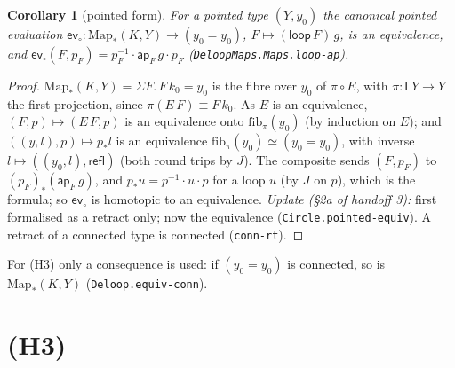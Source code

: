 \documentclass[11pt]{amsart}
\newtheorem{corollary}[theorem]{Corollary}
\theoremstyle{definition}
\theoremstyle{remark}
\newcommand{\Map}{\mathrm{Map}_*}
\newcommand{\fib}{\mathrm{fib}}
\newcommand{\code}[1]{\texttt{#1}}
\newcommand{\Lp}{\mathsf{L}}
\newcommand{\cc}{\cdot}
\newcommand{\refl}{\mathsf{refl}}
\newcommand{\ev}{\mathsf{ev}}
\begin{document}
\begin{corollary}[pointed form]\label{cor:pointed}
For a pointed type $(Y,y_0)$ the canonical pointed evaluation
$\ev_\circ:\Map(K,Y)\to(y_0=y_0)$, $F\mapsto(\mathsf{loop}\,F)\,g$, is an
equivalence, and $\ev_\circ(F,p_F)=p_F^{-1}\cc\mathsf{ap}_F\,g\cc p_F$
(\code{DeloopMaps.Maps.loop-ap}).
\end{corollary}
\begin{proof}
$\Map(K,Y)=\Sigma F.\,F\,k_0=y_0$ is the fibre over $y_0$ of
$\pi\circ E$, with $\pi:\Lp Y\to Y$ the first projection, since
$\pi(E\,F)\equiv F\,k_0$. As $E$ is an equivalence, $(F,p)\mapsto(E\,F,p)$
is an equivalence onto $\fib_\pi(y_0)$ (by induction on $E$); and
$((y,l),p)\mapsto p_*l$ is an equivalence $\fib_\pi(y_0)\simeq(y_0=y_0)$,
with inverse $l\mapsto((y_0,l),\refl)$ (both round trips by $J$). The
composite sends $(F,p_F)$ to $(p_F)_*(\mathsf{ap}_F\,g)$, and
$p_*u=p^{-1}\cc u\cc p$ for a loop $u$ (by $J$ on $p$), which is the
formula; so $\ev_\circ$ is homotopic to an equivalence. \emph{Update
(\S2a of handoff 3):} first formalised as a retract only; now the
equivalence (\code{Circle.pointed-equiv}). A retract of a connected type
is connected (\code{conn-rt}).
\end{proof}
\noindent For (H3) only a consequence is used: if $(y_0=y_0)$ is
connected, so is $\Map(K,Y)$ (\code{Deloop.equiv-conn}).

\section{(H3)}
\end{document}
